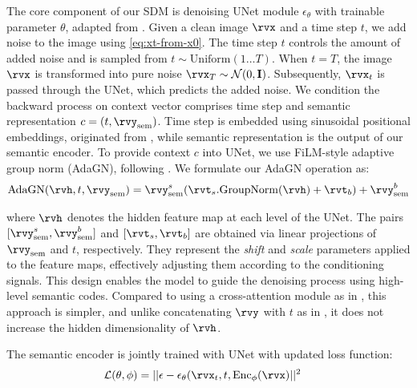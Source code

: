 The core component of our SDM is denoising UNet module $\epsilon_{\theta}$ with trainable parameter $\theta$, adapted from \cite{dhariwalDiffusionModelsBeatGAN2021}. Given a clean image $\rvx$ and a time step $t$, we add noise to the image using \cref{eq:xt-from-x0}. The time step $t$ controls the amount of added noise and is sampled from $t \sim \mathrm{Uniform}(1 \ldots T )$. When $t=T$, the image $\rvx$ is transformed into pure noise $\rvx_T \sim \mathcal{N}(0, \mathbf{I})$. Subsequently, $\rvx_t$ is passed through the UNet, which predicts the added noise. We condition the backward process on context vector comprises time step and semantic representation $c=(t, \rvy_{\text{sem}})$. Time step is embedded using sinusoidal positional embeddings, originated from \cite{vaswani2023attentionneed}, while semantic representation is the output of our semantic encoder. To provide context $c$ into UNet, we use FiLM-style adaptive group norm (\textrm{AdaGN}), following \cite{dhariwalDiffusionModelsBeatGAN2021}. We formulate our \textrm{AdaGN} operation as: 
\begin{align}
    \mathrm{AdaGN}(\rvh, t, \rvy_{\text{sem}}) = \rvy_{\text{sem}}^s (\rvt_s . \mathrm{GroupNorm}(\rvh) + \rvt_b) + \rvy_{\text{sem}}^b \label{eq:adagn}
\end{align}

where $\rvh$ denotes the hidden feature map at each level of the UNet. The pairs $[\rvy_{\text{sem}}^s, \rvy_{\text{sem}}^b]$ and $[\rvt_s, \rvt_b]$ are obtained via linear projections of $\rvy_{\text{sem}}$ and $t$, respectively. They represent the \emph{shift} and \emph{scale} parameters applied to the feature maps, effectively adjusting them according to the conditioning signals. This design enables the model to guide the denoising process using high-level semantic codes. Compared to using a cross-attention module as in \cite{rombachLDM}, this approach is simpler, and unlike concatenating $\rvy$ with $t$ as in \cite{behrendt2025cDDPM}, it does not increase the hidden dimensionality of $\rvh$.

The semantic encoder is jointly trained with UNet with updated loss function: 
\begin{align}
    \mathcal{L} (\theta, \phi) &= || \epsilon - \epsilon_{\theta}(\rvx_t, t, \mathrm{Enc}_{\phi}(\rvx)||^2 \label{ep:loss-cond-encoder-ddpm}
\end{align}

